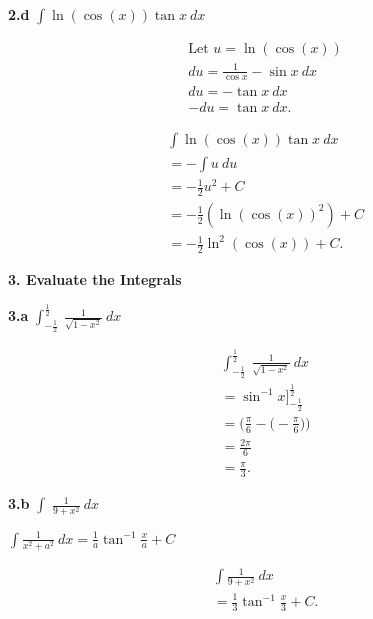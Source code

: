 \documentclass{report}
\begin{document}
    \bigbreak \noindent 
    \begin{mdframed}
        \textbf{2.d} $\int \ln{(\cos{(x)})}\tan{x}\ dx $ 
    \end{mdframed}
    \begin{minipage}[t]{0.47\textwidth}
    \begin{align*}
        &\text{Let $u = \ln{(\cos{(x)})} $} \\
        &du = \frac{1}{\cos{x}}-\sin{x}\ dx \\
        &du = -\tan{x}\ dx \\
        &-du = \tan{x}\ dx
    .\end{align*}
    \end{minipage}
    \begin{minipage}[t]{0.44\textwidth}
    \begin{align*}
        &\int \ln{(\cos{(x)})}\tan{x}\ dx \\
        &=-\int u\ du \\
        &= -\frac{1}{2}u^{2} + C \\
        &=-\frac{1}{2}(\ln{(\cos{(x)})^{2}}) + C \\
        &=-\frac{1}{2}\ln^{2}{(\cos{(x)})} + C
    .\end{align*}
    \end{minipage}

    \bigbreak \noindent 
    \textbf{3. Evaluate the Integrals}
    \bigbreak \noindent 
    \begin{mdframed}
        \textbf{3.a} $\int_{-\frac{1}{2}}^{\frac{1}{2}}\ \frac{1}{\sqrt{1-x^{2}}}\ dx $
    \end{mdframed}
    \bigbreak \noindent 
    \bigbreak \noindent 
    \begin{align*}
        &\int_{-\frac{1}{2}}^{\frac{1}{2}}\ \frac{1}{\sqrt{1-x^{2}}}\ dx \\
        &=\sin^{-1}{x}\bigg]^{\frac{1}{2}}_{-\frac{1}{2}} \\
        &= \bigg(\frac{\pi}{6}-\bigg(-\frac{\pi}{6}\bigg)\bigg) \\
        &=\frac{2\pi}{6} \\
        &= \frac{\pi}{3}
    .\end{align*}

    \pagebreak 
    \begin{mdframed}
       \textbf{3.b} $\int_{}^{}\ \frac{1}{9+x^{2}}\ dx $ 
    \end{mdframed}
    \bigbreak \noindent 
    \begin{remark}
       $\int \frac{1}{x^{2}+a^{2}}\ dx  = \frac{1}{a}\tan^{-1}{\frac{x}{a}}+ C$
    \end{remark}
    \begin{align*}
        &\int \frac{1}{9+x^{2}}\ dx \\
        &= \frac{1}{3}\tan^{-1}{\frac{x}{3}} + C
    .\end{align*}
\end{document}
